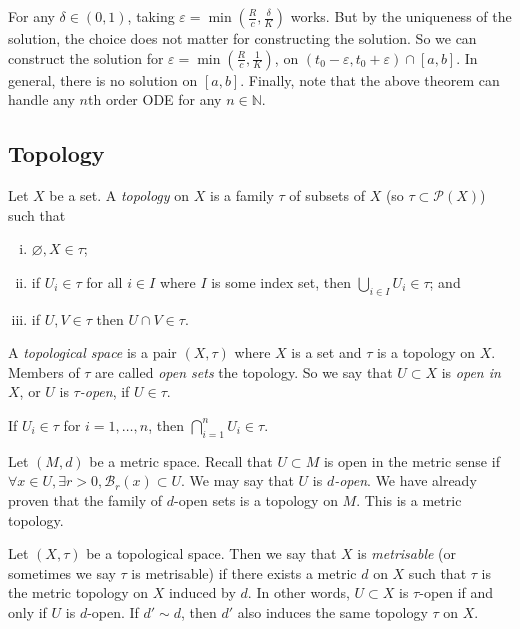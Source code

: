 \begin{remark}
	For any \( \delta \in (0,1) \), taking \( \varepsilon = \min(\frac{R}{c}, \frac{\delta}{K}) \) works.
	But by the uniqueness of the solution, the choice does not matter for constructing the solution.
	So we can construct the solution for \( \varepsilon = \min(\frac{R}{c}, \frac{1}{K}) \), on \( (t_0 - \varepsilon, t_0 + \varepsilon) \cap [a,b] \).
	In general, there is no solution on \( [a,b] \).
	Finally, note that the above theorem can handle any \( n \)th order ODE for any \( n \in \mathbb N \).
\end{remark}

\subsection{Topology}
\begin{definition}
	Let \( X \) be a set.
	A \textit{topology} on \( X \) is a family \( \tau \) of subsets of \( X \) (so \( \tau \subset \mathcal P(X) \)) such that
	\begin{enumerate}[(i)]
		\item \( \varnothing, X \in \tau \);
		\item if \( U_i \in \tau \) for all \( i \in I \) where \( I \) is some index set, then \( \bigcup_{i \in I} U_i \in \tau \); and
		\item if \( U, V \in \tau \) then \( U \cap V \in \tau \).
	\end{enumerate}
	A \textit{topological space} is a pair \( (X, \tau) \) where \( X \) is a set and \( \tau \) is a topology on \( X \).
	Members of \( \tau \) are called \textit{open sets} the topology.
	So we say that \( U \subset X \) is \textit{open in} \( X \), or \( U \) is \( \tau \)\textit{-open}, if \( U \in \tau \).
\end{definition}
\begin{remark}
	If \( U_i \in \tau \) for \( i = 1, \dots, n \), then \( \bigcap_{i=1}^n U_i \in \tau \).
\end{remark}
\begin{example}
	Let \( (M, d) \) be a metric space.
	Recall that \( U \subset M \) is open in the metric sense if \( \forall x \in U, \exists r > 0, \mathcal B_r(x) \subset U \).
	We may say that \( U \) is \( d \)\textit{-open}.
	We have already proven that the family of \( d \)-open sets is a topology on \( M \).
	This is a metric topology.
\end{example}
\begin{definition}
	Let \( (X, \tau) \) be a topological space.
	Then we say that \( X \) is \textit{metrisable} (or sometimes we say \( \tau \) is metrisable) if there exists a metric \( d \) on \( X \) such that \( \tau \) is the metric topology on \( X \) induced by \( d \).
	In other words, \( U \subset X \) is \( \tau \)-open if and only if \( U \) is \( d \)-open.
	If \( d' \sim d \), then \( d' \) also induces the same topology \( \tau \) on \( X \).
\end{definition}
